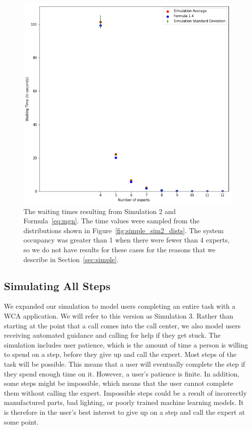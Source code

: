 \begin{figure}[H]
  \includegraphics[width=\textwidth]{figures/montecarlo/independent_calls_lognorm.png}
  \caption{
    The waiting times resulting from Simulation 2 and Formula~\ref{eq:mgn}.
    The time values were sampled from the distributions shown in
    Figure~\ref{fig:simple_sim2_dists}.
    The system occupancy was greater than 1 when there were fewer than 4
    experts, so we do not have results for these cases for the reasons that we
    describe in Section~\ref{sec:simple}.
  }\label{fig:simple_sim2_results}
\end{figure}

\subsection{Simulating All Steps}

We expanded our simulation to model users completing an entire task with a WCA
application.
We will refer to this version as Simulation 3.
Rather than starting at the point that a call comes into the call center, we
also model users receiving automated guidance and calling for help if they get
stuck.
The simulation includes user patience, which is the amount of time a person is
willing to spend on a step, before they give up and call the expert.
Most steps of the task will be possible.
This means that a user will eventually complete the step if they spend enough
time on it.
However, a user's patience is finite.
In addition, some steps might be impossible, which means that the user cannot
complete them without calling the expert.
Impossible steps could be a result of incorrectly manufactured parts, bad
lighting, or poorly trained machine learning models.
It is therefore in the user's best interest to give up on a step and call the
expert at some point.

